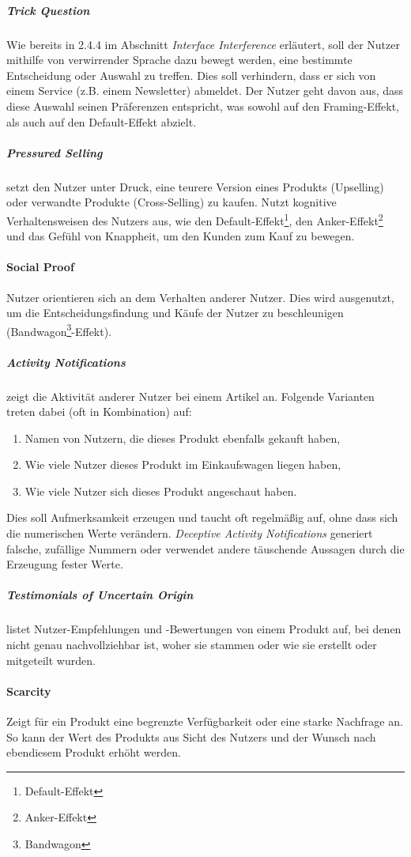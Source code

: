 \documentclass[a4paper]{article}
\begin{document}
\subparagraph{Trick Question}
Wie bereits in 2.4.4 im Abschnitt \textit{Interface Interference} erläutert, soll der Nutzer mithilfe von verwirrender Sprache dazu bewegt werden, eine bestimmte Entscheidung oder Auswahl zu treffen. Dies soll verhindern, dass er sich von einem Service (z.B. einem Newsletter) abmeldet. Der Nutzer geht davon aus, dass diese Auswahl seinen Präferenzen entspricht, was sowohl auf den Framing-Effekt, als auch auf den Default-Effekt abzielt.

\subparagraph{Pressured Selling} setzt den Nutzer unter Druck, eine teurere Version eines Produkts (Upselling) oder verwandte Produkte (Cross-Selling) zu kaufen. Nutzt kognitive Verhaltensweisen des Nutzers aus, wie den Default-Effekt\footnote{\label{foot:6} Default-Effekt}, den Anker-Effekt\footnote{\label{foot:7} Anker-Effekt} und das Gefühl von Knappheit, um den Kunden zum Kauf zu bewegen.


\paragraph{Social Proof}
Nutzer orientieren sich an dem Verhalten anderer Nutzer. Dies wird ausgenutzt, um die Entscheidungsfindung und Käufe der Nutzer zu beschleunigen (Bandwagon\footnote{\label{foot:5} Bandwagon}-Effekt).

\subparagraph{Activity Notifications} zeigt die Aktivität anderer Nutzer bei einem Artikel an. Folgende Varianten treten dabei (oft in Kombination) auf: 
\begin{enumerate}[label=\arabic*)]
	\item{Namen von Nutzern, die dieses Produkt ebenfalls gekauft haben,}
	\item{Wie viele Nutzer dieses Produkt im Einkaufswagen liegen haben,}
	\item{Wie viele Nutzer sich dieses Produkt angeschaut haben.}
\end{enumerate}
Dies soll Aufmerksamkeit erzeugen und taucht oft regelmäßig auf, ohne dass sich die numerischen Werte verändern. \textit{Deceptive Activity Notifications} generiert falsche, zufällige Nummern oder verwendet andere täuschende Aussagen durch die Erzeugung fester Werte.

\subparagraph{Testimonials of Uncertain Origin} listet Nutzer-Empfehlungen und -Bewertungen von einem Produkt auf, bei denen nicht genau nachvollziehbar ist, woher sie stammen oder wie sie erstellt oder mitgeteilt wurden. 

\paragraph{Scarcity}
Zeigt für ein Produkt eine begrenzte Verfügbarkeit oder eine starke Nachfrage an. So kann der Wert des Produkts aus Sicht des Nutzers und der Wunsch nach ebendiesem Produkt erhöht werden.
\end{document}
